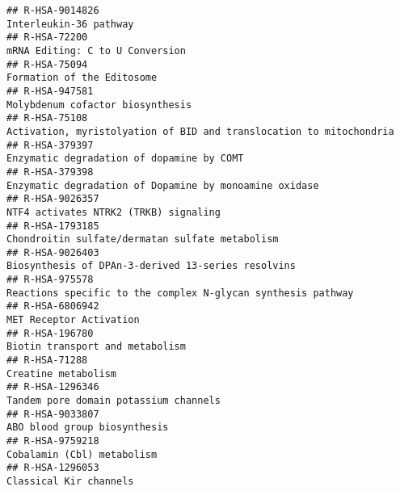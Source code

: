 \documentclass[
]{article}
\begin{document}
\begin{verbatim}
## R-HSA-9014826                                                                                                               Interleukin-36 pathway
## R-HSA-72200                                                                                                        mRNA Editing: C to U Conversion
## R-HSA-75094                                                                                                             Formation of the Editosome
## R-HSA-947581                                                                                                      Molybdenum cofactor biosynthesis
## R-HSA-75108                                                                    Activation, myristolyation of BID and translocation to mitochondria
## R-HSA-379397                                                                                             Enzymatic degradation of dopamine by COMT
## R-HSA-379398                                                                                Enzymatic degradation of Dopamine by monoamine oxidase
## R-HSA-9026357                                                                                                NTF4 activates NTRK2 (TRKB) signaling
## R-HSA-1793185                                                                                      Chondroitin sulfate/dermatan sulfate metabolism
## R-HSA-9026403                                                                                   Biosynthesis of DPAn-3-derived 13-series resolvins
## R-HSA-975578                                                                          Reactions specific to the complex N-glycan synthesis pathway
## R-HSA-6806942                                                                                                              MET Receptor Activation
## R-HSA-196780                                                                                                       Biotin transport and metabolism
## R-HSA-71288                                                                                                                    Creatine metabolism
## R-HSA-1296346                                                                                                Tandem pore domain potassium channels
## R-HSA-9033807                                                                                                         ABO blood group biosynthesis
## R-HSA-9759218                                                                                                           Cobalamin (Cbl) metabolism
## R-HSA-1296053                                                                                                               Classical Kir channels

\end{verbatim}
\end{document}
